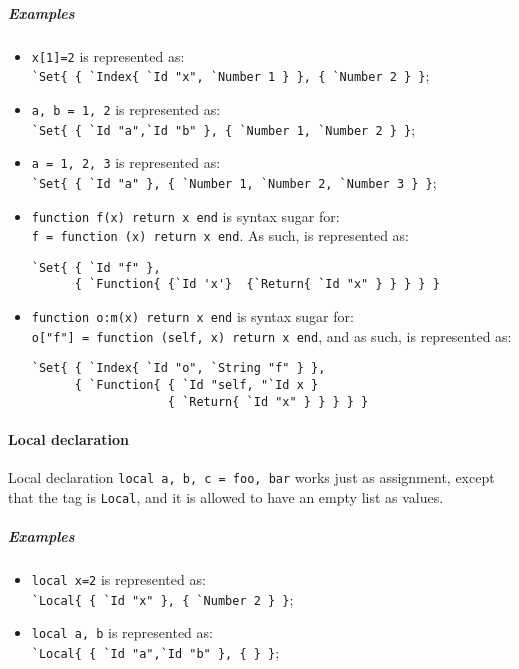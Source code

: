 \subparagraph{Examples}
\begin{itemize}

\item \verb+x[1]=2+ is represented as:\\
  \verb+`Set{ { `Index{ `Id "x", `Number 1 } }, { `Number 2 } }+;

\item \verb+a, b = 1, 2+ is represented as:\\
  \verb+`Set{ { `Id "a",`Id "b" }, { `Number 1, `Number 2 } }+;

\item \verb+a = 1, 2, 3+ is represented as:\\
  \verb+`Set{ { `Id "a" }, { `Number 1, `Number 2, `Number 3 } }+;

\item \verb+function f(x) return x end+ is syntax sugar for:\\
  \verb+f = function (x) return x end+. As such, is represented as:\\[-2em]
\begin{verbatim}
`Set{ { `Id "f" }, 
      { `Function{ {`Id 'x'}  {`Return{ `Id "x" } } } } }
\end{verbatim}

\item \verb+function o:m(x) return x end+ is syntax sugar for:\\
  \verb+o["f"] = function (self, x) return x end+, and as such, is
  represented as:\\[-2em]
\begin{verbatim}
`Set{ { `Index{ `Id "o", `String "f" } }, 
      { `Function{ { `Id "self, "`Id x } 
                   { `Return{ `Id "x" } } } } }
\end{verbatim}

\end{itemize}

\paragraph{Local declaration}
Local declaration \verb+local a, b, c = foo, bar+ works just as
assignment, except that the tag is \verb+Local+, and it is allowed to
have an empty list as values.

\subparagraph{Examples}
\begin{itemize}

\item \verb+local x=2+ is represented as:\\
  \verb+`Local{ { `Id "x" }, { `Number 2 } }+;

\item \verb+local a, b+ is represented as:\\
  \verb+`Local{ { `Id "a",`Id "b" }, { } }+;

\end{itemize}

